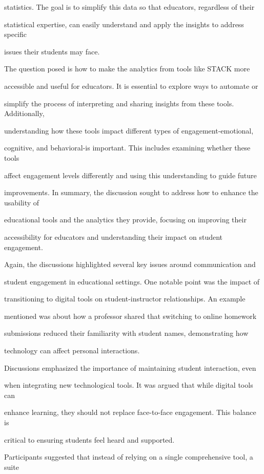 \documentclass[11pt]{article}
\begin{document}
statistics. The goal is to simplify this data so that educators, regardless of their

statistical expertise, can easily understand and apply the insights to address specific

issues their students may face.

The question posed is how to make the analytics from tools like STACK more

accessible and useful for educators. It is essential to explore ways to automate or

simplify the process of interpreting and sharing insights from these tools. Additionally,

understanding how these tools impact different types of engagement-emotional,

cognitive, and behavioral-is important. This includes examining whether these tools

affect engagement levels differently and using this understanding to guide future

improvements. In summary, the discussion sought to address how to enhance the usability of

educational tools and the analytics they provide, focusing on improving their

accessibility for educators and understanding their impact on student engagement.

Again, the discussions highlighted several key issues around communication and

student engagement in educational settings. One notable point was the impact of

transitioning to digital tools on student-instructor relationships. An example

mentioned was about how a professor shared that switching to online homework

submissions reduced their familiarity with student names, demonstrating how

technology can affect personal interactions.

Discussions emphasized the importance of maintaining student interaction, even

when integrating new technological tools. It was argued that while digital tools can

enhance learning, they should not replace face-to-face engagement. This balance is

critical to ensuring students feel heard and supported.

Participants suggested that instead of relying on a single comprehensive tool, a suite
\end{document}
